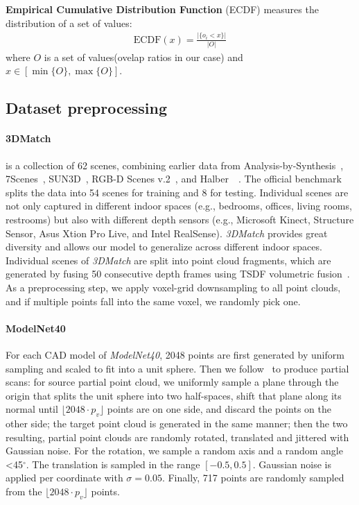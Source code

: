 \textbf{Empirical Cumulative Distribution Function} (ECDF) measures the distribution of a set of values:
\begin{equation}
\begin{aligned}
\text{ECDF} (x) = \frac{\big|\{o_i < x\}\big|}{\big|O\big|}
\end{aligned}
\end{equation}
where $O$ is a set of values(ovelap ratios in our case) and $x \in [\min\{O\}, \max\{O\}]$.

\subsection{Dataset preprocessing}
\label{sec:datasets_supp}
\paragraph{3DMatch}
\cite{zeng20163dmatch} is a collection of 62 scenes, combining earlier data from Analysis-by-Synthesis~\cite{valentin2016learning}, 7Scenes~\cite{shotton2013scene}, SUN3D~\cite{xiao2013sun3d}, RGB-D Scenes v.2~\cite{lai2014unsupervised}, and Halber~\etal~\cite{Halber2016StructuredGR}.  The official benchmark splits the data into 54 scenes for training and 8 for testing. Individual scenes are not only captured in different indoor spaces (e.g., bedrooms, offices, living rooms, restrooms) but also with different depth sensors (e.g., Microsoft Kinect, Structure Sensor, Asus Xtion Pro Live, and Intel RealSense). \emph{3DMatch} provides great diversity and allows our model to generalize across different indoor spaces. Individual scenes of \emph{3DMatch} are split into point cloud fragments, which are generated by fusing 50 consecutive depth frames using TSDF volumetric fusion~\cite{curless1996volumetric}. As a preprocessing step, we apply voxel-grid downsampling to all point clouds, and if multiple points fall into the same voxel, we randomly pick one.

\paragraph{ModelNet40}
For each CAD model of \emph{ModelNet40}, 2048 points are first generated by uniform sampling and scaled to fit into a unit sphere. Then we follow~\cite{yew2020rpm} to produce partial scans: for source partial point cloud, we uniformly sample a plane through the origin that splits the unit sphere into two half-spaces, shift that plane along its normal until $\lfloor 2048\cdot p_v \rfloor$ points are on one side, and discard the points on the other side; the target point cloud is generated in the same manner; then the two resulting, partial point clouds are randomly rotated, translated and jittered with Gaussian noise. For the rotation, we sample a random axis and a random angle \textless45$^\circ$. The translation is sampled in the range $[-0.5,0.5]$. Gaussian noise is applied per coordinate with $\sigma\!=\!0.05$. Finally, 717 points are randomly sampled from the $\lfloor 2048\cdot p_v \rfloor$ points.


